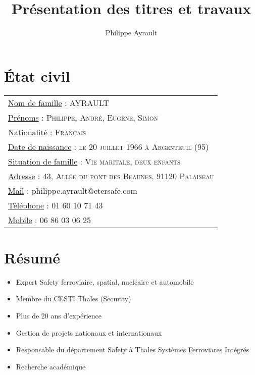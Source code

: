 \documentclass[a4paper,12pt]{article}
\title{Pr\'esentation des titres et travaux}
\author{Philippe  Ayrault}
\begin{document}


\maketitle


\section{\'Etat civil}
\begin{tabular}{l}
\underline{Nom de famille} : \textsc{AYRAULT} \\
\underline{Pr\'enoms} : \textsc{Philippe, Andr\'e, Eug\`ene, Simon} \\
\underline{Nationalit\'e} : \textsc{Fran\c{c}ais}\\
\underline{Date de naissance} : \textsc{le 20 juillet 1966 \`a
  Argenteuil (95)} \\
\underline{Situation de famille} : \textsc{Vie maritale, deux enfants} \\
\underline{Adresse} : \textsc{43, All\'ee du pont des Beaunes, 91120
  Palaiseau} \\
\underline{Mail} : philippe.ayrault@etersafe.com \\
\underline{T\'el\'ephone} : 01 60 10 71 43 \\
\underline{Mobile} : 06 86 03 06 25 \\

\end{tabular}


\section{R\'esum\'e}


\begin{itemize}
\item Expert Safety ferroviaire, spatial, nucl\'eaire et automobile
\item Membre du CESTI Thales (Security)
\item Plus de 20 ans d'exp\'erience
\item Gestion de projets nationaux et internationaux
\item Responsable du d\'epartement Safety \`a Thales Syst\`emes
  Ferroviares Int\'egr\'es
\item Recherche acad\'emique
\end{itemize}
\end{document}

